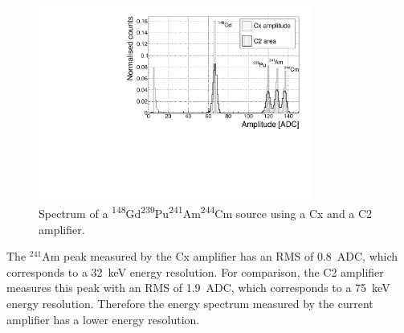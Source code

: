 \begin{figure}[!t]
\centering
\includegraphics[width=0.8\textwidth]{../scripts/05_current_monitoring/plot4alpha/plots/4alphaCompare}
\caption{Spectrum of a \textsuperscript{148}Gd\textsuperscript{239}Pu\textsuperscript{241}Am\textsuperscript{244}Cm source using a Cx and a C2 amplifier.}
\label{fig:c2cx4alpha}
\end{figure}
The $^{241}$Am peak measured by the Cx amplifier has an RMS of 0.8~ADC, which corresponds to a 32~keV energy resolution. For comparison, the C2 amplifier measures this peak with an RMS of 1.9~ADC, which corresponds to a 75~keV energy resolution. Therefore the energy spectrum measured by the current amplifier has a lower energy resolution.









\clearpage
